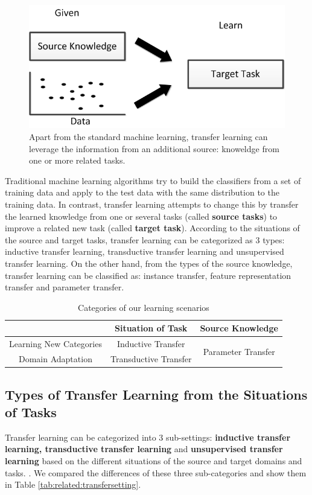 \begin{figure}
	\centering
	\includegraphics[scale =.7]{relatedwork/fig/transfer.png}
	\caption{Apart from the standard machine learning, transfer learning can leverage the information from an additional source: knoweldge from one or more related tasks.}
\end{figure}

Traditional machine learning algorithms try to build the classifiers from a set of training data and apply to the test data with the same distribution to the training data. In contrast, transfer learning attempts to change this by transfer the learned knowledge from one or several tasks (called \textbf{source tasks}) to improve a related new task (called \textbf{target task}). According to the situations of the source and target tasks, transfer learning can be categorized as 3 types: inductive transfer learning, transductive transfer learning and {unsupervised transfer learning}. On the other hand, from the types of the source knowledge, transfer learning can be classified as: instance transfer, feature representation transfer and parameter transfer. 

\begin{table}[htbp]
	\centering
	\caption{Categories of our learning scenarios}
	\begin{tabular}{|c|c|c|}
	\hline
		& Situation of Task     & Source Knowledge \\
		\hline
		Learning New Categories & Inductive Transfer & \multirow{2}[0]{*}{Parameter Transfer} \\
		\cline{1-2}
		Domain Adaptation & Transductive Transfer &  \\
		\hline
	\end{tabular}%
\end{table}%


\subsection{Types of Transfer Learning from the Situations of Tasks}
Transfer learning can be categorized into 3 sub-settings: \textbf{inductive transfer learning, transductive transfer learning} and \textbf{unsupervised transfer learning} based on the different situations of the source and target domains and tasks. \cite{pan2010survey}. We compared the differences of these three sub-categories and show them in Table \ref{tab:related:transfersetting}. 

